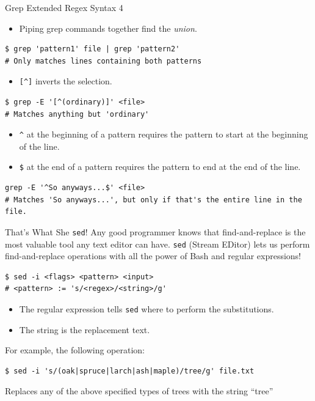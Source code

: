 \documentclass[11pt]{beamer}
\begin{document}
\begin{frame}[fragile=singleslide]{Grep Extended Regex Syntax 4}
\begin{itemize}
\item Piping grep commands together find the \emph{union}.
\end{itemize}
\begin{lstlisting}[style=terminal]
$ grep 'pattern1' file | grep 'pattern2'
# Only matches lines containing both patterns
\end{lstlisting}
\begin{itemize}
\item \texttt{[\textasciicircum]} inverts the selection.
\end{itemize}
\begin{lstlisting}[style=terminal]
$ grep -E '[^(ordinary)]' <file>
# Matches anything but 'ordinary'
\end{lstlisting}
\begin{itemize}
\item \texttt{\textasciicircum} at the beginning of a pattern requires the pattern to start at the beginning of the line.
\item \texttt{\$} at the end of a pattern requires the pattern to end at the end of the line.
\end{itemize}
\begin{lstlisting}[style=terminal]
grep -E '^So anyways...$' <file>
# Matches 'So anyways...', but only if that's the entire line in the file.  
\end{lstlisting}
\end{frame}

\begin{frame}[fragile=singleslide]{That's What She \texttt{sed}!}
Any good programmer knows that find-and-replace is the most valuable tool any text editor can have.  \texttt{sed} (Stream EDitor) lets us perform find-and-replace operations with all the power of Bash and regular expressions!  
\begin{lstlisting}[style=terminal]
$ sed -i <flags> <pattern> <input>
# <pattern> := 's/<regex>/<string>/g' 
\end{lstlisting}
\begin{itemize}
\item The regular expression tells \texttt{sed} where to perform the substitutions.
\item The string is the replacement text. 
\end{itemize}
For example, the following operation:
\begin{lstlisting}[style=terminal]
$ sed -i 's/(oak|spruce|larch|ash|maple)/tree/g' file.txt
\end{lstlisting}
Replaces any of the above specified types of trees with the string ``tree''
\end{frame}
\end{document}
